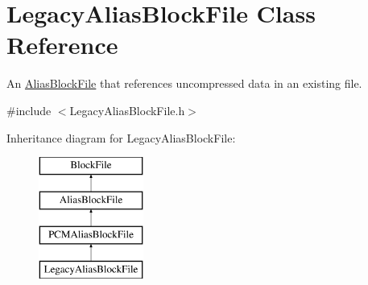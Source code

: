 \hypertarget{class_legacy_alias_block_file}{}\section{Legacy\+Alias\+Block\+File Class Reference}
\label{class_legacy_alias_block_file}


An \hyperlink{class_alias_block_file}{Alias\+Block\+File} that references uncompressed data in an existing file.  




{\ttfamily \#include $<$Legacy\+Alias\+Block\+File.\+h$>$}

Inheritance diagram for Legacy\+Alias\+Block\+File\+:\begin{figure}[H]
\begin{center}
\leavevmode
\includegraphics[height=4.000000cm]{class_legacy_alias_block_file}
\end{center}
\end{figure}
